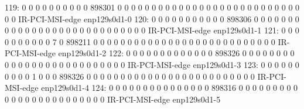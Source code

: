  119:          0          0          0          0          0          0          0          0          0          0     898301          0          0          0          0          0          0          0          0          0          0          0          0          0          0          0          0          0          0          0          0          0          0          0          0          0          0          0          0          0  IR-PCI-MSI-edge      enp129s0d1-0
 120:          0          0          0          0          0          0          0          0          0          0          0     898306          0          0          0          0          0          0          0          0          0          0          0          0          0          0          0          0          0          0          0          0          0          0          0          0          0          0          0          0  IR-PCI-MSI-edge      enp129s0d1-1
 121:          0          0          0          0          0          0          0          0          0          0          7          0     898211          0          0          0          0          0          0          0          0          0          0          0          0          0          0          0          0          0          0          0          0          0          0          0          0          0          0          0  IR-PCI-MSI-edge      enp129s0d1-2
 122:          0          0          0          0          0          0          0          0          0          0          0          0          0     898326          0          0          0          0          0          0          0          0          0          0          0          0          0          0          0          0          0          0          0          0          0          0          0          0          0          0  IR-PCI-MSI-edge      enp129s0d1-3
 123:          0          0          0          0          0          0          0          0          0          0          1          0          0          0     898326          0          0          0          0          0          0          0          0          0          0          0          0          0          0          0          0          0          0          0          0          0          0          0          0          0  IR-PCI-MSI-edge      enp129s0d1-4
 124:          0          0          0          0          0          0          0          0          0          0          0          0          0          0          0     898316          0          0          0          0          0          0          0          0          0          0          0          0          0          0          0          0          0          0          0          0          0          0          0          0  IR-PCI-MSI-edge      enp129s0d1-5

